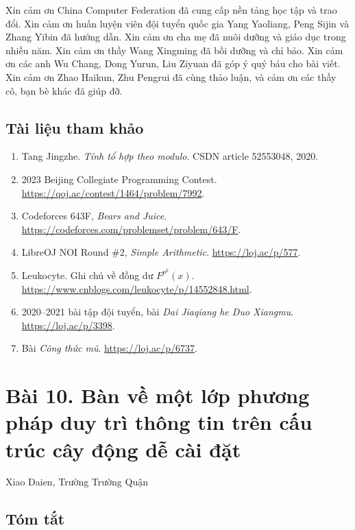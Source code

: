 \documentclass[11pt]{article}
\begin{document}
Xin cảm ơn China Computer Federation đã cung cấp nền tảng học tập và trao đổi.
Xin cảm ơn huấn luyện viên đội tuyển quốc gia Yang Yaoliang, Peng Sijin và
Zhang Yibin đã hướng dẫn. Xin cảm ơn cha mẹ đã nuôi dưỡng và giáo dục trong
nhiều năm. Xin cảm ơn thầy Wang Xingming đã bồi dưỡng và chỉ bảo. Xin cảm ơn
các anh Wu Chang, Dong Yurun, Liu Ziyuan đã góp ý quý báu cho bài viết. Xin cảm
ơn Zhao Haikun, Zhu Pengrui đã cùng thảo luận, và cảm ơn các thầy cô, bạn bè
khác đã giúp đỡ.

\subsection*{Tài liệu tham khảo}

\begin{enumerate}
  \item Tang Jingzhe. \emph{Tính tổ hợp theo modulo}. CSDN article 52553048,
  2020.
  \item 2023 Beijing Collegiate Programming Contest.
  \url{https://qoj.ac/contest/1464/problem/7992}.
  \item Codeforces 643F, \emph{Bears and Juice}.
  \url{https://codeforces.com/problemset/problem/643/F}.
  \item LibreOJ NOI Round \#2, \emph{Simple Arithmetic}.
  \url{https://loj.ac/p/577}.
  \item Leukocyte. Ghi chú về đồng dư \(F^{p^k}(x)\).
  \url{https://www.cnblogs.com/leukocyte/p/14552848.html}.
  \item 2020--2021 bài tập đội tuyển, bài \emph{Dai Jiaqiang he Duo Xiangmu}.
  \url{https://loj.ac/p/3398}.
  \item Bài \emph{Công thức mũ}. \url{https://loj.ac/p/6737}.
\end{enumerate}

\section*{Bài 10. Bàn về một lớp phương pháp duy trì thông tin trên cấu trúc cây động dễ cài đặt}

\begin{center}
Xiao Daien, Trường Trường Quận
\end{center}

\subsection*{Tóm tắt}
\end{document}
